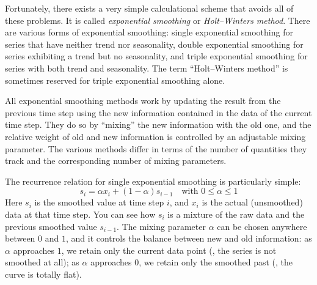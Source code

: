 Fortunately, there exists a very simple calculational scheme that
avoids all of these problems. It is called \emph{exponential
  smoothing} or \emph{Holt--Winters method}. There are various forms
of exponential smoothing: single exponential smoothing for series that
have neither trend nor seasonality, double exponential smoothing for
series exhibiting a trend but no seasonality, and triple exponential
smoothing for series with both trend and seasonality.  The term
``Holt--Winters method'' is sometimes reserved for triple exponential
smoothing alone.

All exponential smoothing methods work by updating the result from the
previous time step using the new information contained in the data of
the current time step. They do so by ``mixing'' the new information
with the old one, and the relative weight of old and new information
is controlled by an adjustable mixing parameter. The various methods
differ in terms of the number of quantities they track and the
corresponding number of mixing parameters.

The recurrence relation for single exponential smoothing is
particularly simple:
%
\[
s_i = \alpha x_i + (1-\alpha) s_{i-1} \quad \text{with $0 \le \alpha \le 1$}
\] 
%
Here $s_i$ is the smoothed value at time step $i$, and $x_i$ is the
actual (unsmoothed) data at that time step. You can see how $s_i$ is a
mixture of the raw data and the previous smoothed value $s_{i-1}$.
The mixing parameter $\alpha$ can be chosen anywhere between $0$ and
$1$, and it controls the balance between new and old information: as
$\alpha$ approaches $1$, we retain only the current data point (\ie,
the series is not smoothed at all); as $\alpha$ approaches $0$, we
retain only the smoothed past (\ie, the curve is totally flat).


